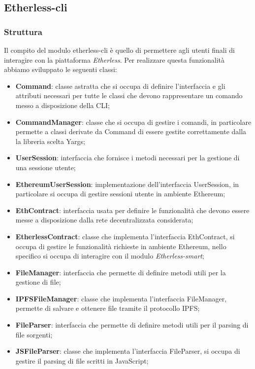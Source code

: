 \subsection{Etherless-cli}
\subsubsection{Struttura}
Il compito del modulo etherless-cli è quello di permettere agli utenti finali di interagire con la piattaforma \textit{Etherless}. Per realizzare questa funzionalità abbiamo sviluppato le seguenti classi:
\begin{itemize}
	\item \textbf{Command}: classe astratta che si occupa di definire l'interfaccia e gli attributi necessari per tutte le classi che devono rappresentare un comando messo a disposizione della CLI;
	\item \textbf{CommandManager}: classe che si occupa di gestire i comandi, in particolare permette a classi derivate da Command di essere gestite correttamente dalla la libreria scelta Yargs;
	\item \textbf{UserSession}: interfaccia che fornisce i metodi necessari per la gestione di una sessione utente; 
	\item \textbf{EthereumUserSession}: implementazione dell'interfaccia UserSession, in particolare si occupa di gestire sessioni utente in ambiente Ethereum; 
	\item \textbf{EthContract}: interfaccia usata per definire le funzionalità che devono essere messe a disposizione dalla rete decentralizzata considerata; 
	\item \textbf{EtherlessContract}: classe che implementa l'interfaccia EthContract, si occupa di gestire le funzionalità richieste in ambiente Ethereum, nello specifico si occupa di interagire con il modulo \textit{Etherless-smart}; 
	\item \textbf{FileManager}: interfaccia che permette di definire metodi utili per la gestione di file; 
	\item \textbf{IPFSFileManager}: classe che implementa l'interfaccia FileManager, permette di salvare e ottenere file tramite il protocollo IPFS; 
	\item \textbf{FileParser}: interfaccia che permette di definire metodi utili per il parsing di file sorgenti; 
	\item \textbf{JSFileParser}: classe che implementa l'interfaccia FileParser, si occupa di gestire il parsing di file scritti in JavaScript; 
\end{itemize}

